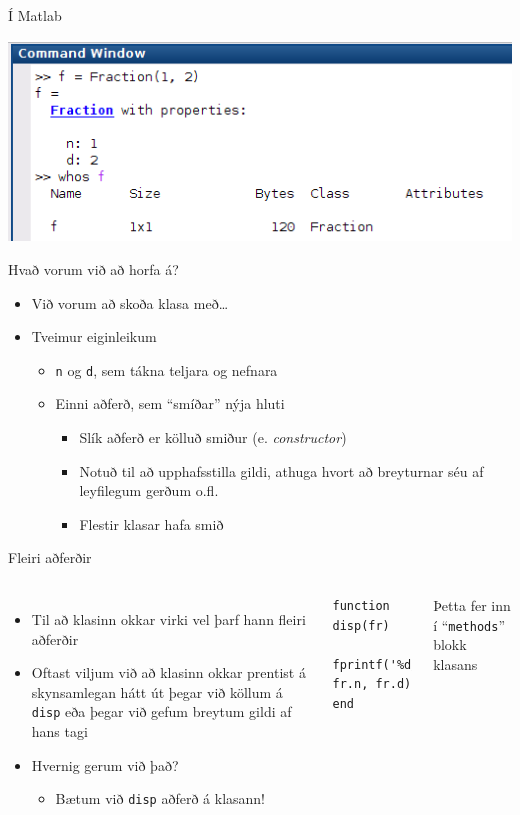 \documentclass{beamer}
\begin{document}
\begin{frame}{Í Matlab}
\begin{center}
\includegraphics[width=\textheight]{Pics/fraction-workspace}
\end{center}
\end{frame}


\begin{frame}{Hvað vorum við að horfa á?}
\begin{itemize}
 \item Við vorum að skoða klasa með\ldots
 \item Tveimur eiginleikum
 \begin{itemize}
  \item \texttt{n} og \texttt{d}, sem tákna teljara og nefnara
  \item Einni aðferð, sem ``smíðar'' nýja hluti
  \begin{itemize}
   \item Slík aðferð er kölluð smiður (e. \emph{constructor})
   \item Notuð til að upphafsstilla gildi, athuga hvort að breyturnar séu af leyfilegum gerðum o.fl.
   \item Flestir klasar hafa smið
  \end{itemize}
 \end{itemize}
\end{itemize}
\end{frame}

\begin{frame}[fragile]{Fleiri aðferðir}
\begin{columns}
\begin{itemize}
 \item Til að klasinn okkar virki vel þarf hann fleiri aðferðir
 \item Oftast viljum við að klasinn okkar prentist á skynsamlegan hátt út þegar við köllum á \texttt{disp} eða þegar við gefum breytum gildi af hans tagi
 \item Hvernig gerum við það?
 \begin{itemize}
  \item Bætum við \texttt{disp} aðferð á klasann!
 \end{itemize}
\end{itemize}

\begin{verbatim}
function disp(fr)
    fprintf('%d/%d\n', fr.n, fr.d)
end
\end{verbatim}

Þetta fer inn í ``\texttt{methods}'' blokk klasans
\end{columns}
\end{frame}
\end{document}
